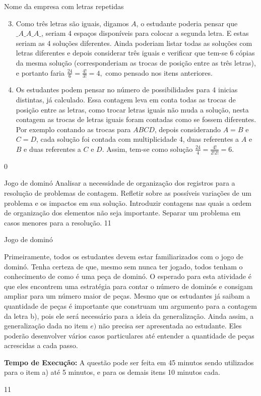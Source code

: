 \begin{answer}{Nome da empresa com letras repetidas}
{
\begin{enumerate}\setcounter{enumi}{2}

\item  Como três letras são iguais, digamos $A$, o estudante poderia pensar que $\_A\_A\_A\_$, seriam 4 espaços disponíveis para colocar a segunda letra. E estas seriam as 4 soluções diferentes. Ainda poderiam listar todas as soluções com letras diferentes e depois considerar três iguais e verificar que tem-se 6 cópias da mesma solução (corresponderiam as trocas de posição entre as três letras), e portanto faria $\frac{24}{6} = \frac{4!}{3!}=4,$ como pensado nos itens anteriores.
\item  Os estudantes podem pensar no número de possibilidades para 4 inicias distintas, já calculado. Essa contagem leva em conta todas as trocas de posição entre as letras, como trocar letras iguais não muda a solução, nesta contagem as trocas de letras iguais foram contadas como se fossem diferentes. Por exemplo contando as trocas para $ABCD$, depois considerando $A=B$ e $C=D$, cada solução foi contada com multiplicidade 4, duas referentes a $A$ e $B$ e duas referentes a $C$ e $D$. Assim, tem-se como solução $\frac{24}{4} = \frac{4!}{2!2!}=6.$
\end{enumerate}
}{0}
\end{answer}

\begin{objectives}{Jogo de dominó}
{
Analisar a necessidade de organização dos registros para a resolução de problemas de contagem. Refletir sobre as possíveis variações de um problema e os impactos em sua solução. Introduzir contagens nas quais a ordem de organização dos elementos não seja importante. Separar um problema em casos menores para a resolução.
}{1}{1}
\end{objectives}
\begin{sugestions}{Jogo de dominó}
{
Primeiramente, todos os estudantes devem estar familiarizados com o jogo de dominó. Tenha certeza de que, mesmo sem nunca ter jogado, todos tenham o conhecimento de como é uma peça de dominó. O esperado para esta atividade é que eles encontrem uma estratégia para contar o número de dominós e consigam ampliar para um número maior de peças. Mesmo que os estudantes já saibam a quantidade de peças é importante que construam um argumento para a contagem da letra b), pois ele será necessário para a ideia da generalização. Ainda assim, a generalização dada no item $e)$ não precisa ser apresentada ao estudante. Eles poderão desenvolver vários casos particulares até entender a quantidade de peças acrescidas a cada passo.

\textbf{Tempo de Execução:} A questão pode ser feita em 45 minutos sendo utilizados para o item a) até 5  minutos, e para os demais itens 10 minutos cada.
}{1}{1}
\end{sugestions}

